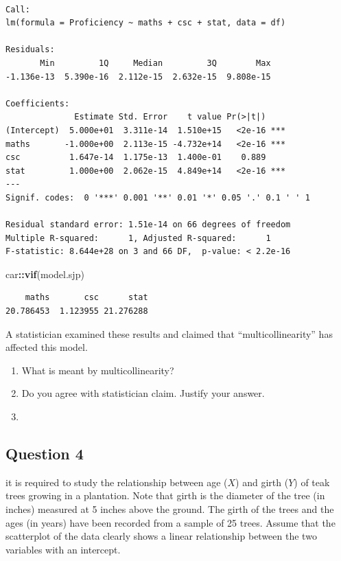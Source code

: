 \documentclass[]{article}
\newenvironment{Shaded}{\begin{snugshade}}{\end{snugshade}}
\newcommand{\KeywordTok}[1]{\textcolor[rgb]{0.13,0.29,0.53}{\textbf{#1}}}
\newcommand{\NormalTok}[1]{#1}
\newcommand{\OperatorTok}[1]{\textcolor[rgb]{0.81,0.36,0.00}{\textbf{#1}}}
\begin{document}
\begin{verbatim}

Call:
lm(formula = Proficiency ~ maths + csc + stat, data = df)

Residuals:
       Min         1Q     Median         3Q        Max 
-1.136e-13  5.390e-16  2.112e-15  2.632e-15  9.808e-15 

Coefficients:
              Estimate Std. Error    t value Pr(>|t|)    
(Intercept)  5.000e+01  3.311e-14  1.510e+15   <2e-16 ***
maths       -1.000e+00  2.113e-15 -4.732e+14   <2e-16 ***
csc          1.647e-14  1.175e-13  1.400e-01    0.889    
stat         1.000e+00  2.062e-15  4.849e+14   <2e-16 ***
---
Signif. codes:  0 '***' 0.001 '**' 0.01 '*' 0.05 '.' 0.1 ' ' 1

Residual standard error: 1.51e-14 on 66 degrees of freedom
Multiple R-squared:      1, Adjusted R-squared:      1 
F-statistic: 8.644e+28 on 3 and 66 DF,  p-value: < 2.2e-16
\end{verbatim}

\begin{Shaded}
\begin{Highlighting}[]
\NormalTok{car}\OperatorTok{::}\KeywordTok{vif}\NormalTok{(model.sjp)}
\end{Highlighting}
\end{Shaded}

\begin{verbatim}
    maths       csc      stat 
20.786453  1.123955 21.276288 
\end{verbatim}

A statistician examined these results and claimed that
``multicollinearity'' has affected this model.

\begin{enumerate}
\def\labelenumi{\roman{enumi})}
\item
  What is meant by multicollinearity?
\item
  Do you agree with statistician claim. Justify your answer.
\item
\end{enumerate}

\hypertarget{question-4}{%
\subsection{Question 4}\label{question-4}}

it is required to study the relationship between age (\(X\)) and girth
(\(Y\)) of teak trees growing in a plantation. Note that girth is the
diameter of the tree (in inches) measured at 5 inches above the ground.
The girth of the trees and the ages (in years) have been recorded from a
sample of 25 trees. Assume that the scatterplot of the data clearly
shows a linear relationship between the two variables with an intercept.
\end{document}
